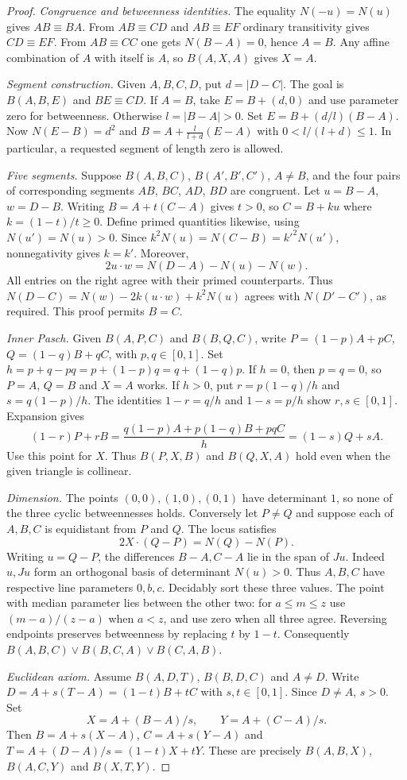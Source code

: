 \begin{proof}
\emph{Congruence and betweenness identities.}
The equality $N(-u)=N(u)$ gives $AB\equiv BA$.
From $AB\equiv CD$ and $AB\equiv EF$ ordinary transitivity gives
$CD\equiv EF$. From $AB\equiv CC$ one gets $N(B-A)=0$, hence $A=B$.
Any affine combination of $A$ with itself is $A$, so $B(A,X,A)$ gives $X=A$.

\emph{Segment construction.}
Given $A,B,C,D$, put $d=|D-C|$. The goal is $B(A,B,E)$ and $BE\equiv CD$.
If $A=B$, take $E=B+(d,0)$ and use parameter zero for betweenness.
Otherwise $l=|B-A|>0$. Set $E=B+(d/l)(B-A)$. Now
$N(E-B)=d^2$ and $B=A+\tfrac{l}{l+d}(E-A)$ with
$0<l/(l+d)\leq1$. In particular, a requested segment of length zero
is allowed.

\emph{Five segments.}
Suppose $B(A,B,C)$, $B(A',B',C')$, $A\ne B$, and the four pairs of
corresponding segments $AB$, $BC$, $AD$, $BD$ are congruent.
Let $u=B-A$, $w=D-B$. Writing $B=A+t(C-A)$ gives $t>0$, so
$C=B+ku$ where $k=(1-t)/t\geq0$. Define primed quantities likewise,
using $N(u')=N(u)>0$. Since $k^2N(u)=N(C-B)=k'^2N(u')$,
nonnegativity gives $k=k'$. Moreover,
\[
  2u\cdot w=N(D-A)-N(u)-N(w).
\]
All entries on the right agree with their primed counterparts. Thus
$N(D-C)=N(w)-2k(u\cdot w)+k^2N(u)$ agrees with $N(D'-C')$, as required.
This proof permits $B=C$.

\emph{Inner Pasch.}
Given $B(A,P,C)$ and $B(B,Q,C)$, write
$P=(1-p)A+pC$, $Q=(1-q)B+qC$, with $p,q\in[0,1]$.
Set $h=p+q-pq=p+(1-p)q=q+(1-q)p$. If $h=0$,
then $p=q=0$, so $P=A$, $Q=B$ and $X=A$ works. If $h>0$,
put $r=p(1-q)/h$ and $s=q(1-p)/h$. The identities
$1-r=q/h$ and $1-s=p/h$ show $r,s\in[0,1]$. Expansion gives
\[
  (1-r)P+rB
  =\frac{q(1-p)A+p(1-q)B+pqC}{h}
  =(1-s)Q+sA .
\]
Use this point for $X$. Thus $B(P,X,B)$ and $B(Q,X,A)$ hold even
when the given triangle is collinear.

\emph{Dimension.}
The points $(0,0),(1,0),(0,1)$ have determinant $1$, so none of the
three cyclic betweennesses holds. Conversely let $P\ne Q$ and suppose
each of $A,B,C$ is equidistant from $P$ and $Q$. The locus satisfies
\[
                2X\cdot(Q-P)=N(Q)-N(P).
\]
Writing $u=Q-P$, the differences $B-A,C-A$ lie in the span of $Ju$.
Indeed $u,Ju$ form an orthogonal basis of determinant $N(u)>0$.
Thus $A,B,C$ have respective line parameters $0,b,c$.
Decidably sort these three values. The point with median parameter
lies between the other two: for $a\leq m\leq z$ use $(m-a)/(z-a)$
when $a<z$, and use zero when all three agree. Reversing endpoints
preserves betweenness by replacing $t$ by $1-t$. Consequently
$B(A,B,C)\lor B(B,C,A)\lor B(C,A,B)$.

\emph{Euclidean axiom.}
Assume $B(A,D,T)$, $B(B,D,C)$ and $A\ne D$. Write
$D=A+s(T-A)=(1-t)B+tC$ with $s,t\in[0,1]$. Since $D\ne A$,
$s>0$. Set
\[
 X=A+(B-A)/s,\qquad Y=A+(C-A)/s .
\]
Then $B=A+s(X-A)$, $C=A+s(Y-A)$ and
$T=A+(D-A)/s=(1-t)X+tY$. These are precisely
$B(A,B,X)$, $B(A,C,Y)$ and $B(X,T,Y)$.
\end{proof}

